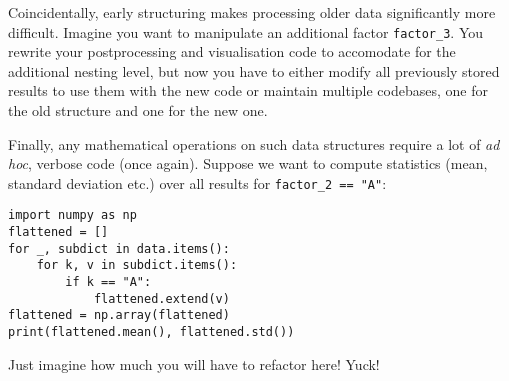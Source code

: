 \vspace{3 pt}

Coincidentally, early structuring makes processing older data significantly more difficult.
Imagine you want to manipulate an additional factor \lstinline{factor_3}.
You rewrite your postprocessing and visualisation code to accomodate for the additional nesting level,
but now you have to either modify all previously stored results to use them with the new code
or maintain multiple codebases, one for the old structure and one for the new one.

\vspace{3 pt}

Finally, any mathematical operations on such data structures require
a lot of \emph{ad hoc}, verbose code (once again).
Suppose we want to compute statistics (mean, standard deviation etc.)
over all results for \lstinline{factor_2 == "A"}:

\begin{lstlisting}
import numpy as np
flattened = []
for _, subdict in data.items():
    for k, v in subdict.items():
        if k == "A":
            flattened.extend(v)
flattened = np.array(flattened)
print(flattened.mean(), flattened.std())
\end{lstlisting}

\vspace{-22 pt}

Just imagine how much you will have to refactor here! Yuck!
